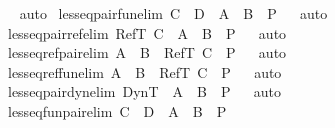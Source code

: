 \begin{isabellebody}
\ \endisadelimproof
\isatagproof
{}\isamarkupfalse \ auto\endisatagproof
{\isafoldproof}\isadelimproof
\endisadelimproof
\isanewline
{}\isamarkupfalse \ lesseq{\isacharunderscore}pair{\isacharunderscore}fun{\isacharbrackleft}elim{\isacharbang}{\isacharbrackright}{\isacharcolon}\ {\isachardoublequoteopen}C\ {\isasymrightarrow}\ D\ {\isasymsqsubseteq}\ A\ {\isasymtimes}\ B\ {\isasymLongrightarrow}\ P{\isachardoublequoteclose}\isadelimproof
\ \endisadelimproof
\isatagproof
{}\isamarkupfalse \ auto\endisatagproof
{\isafoldproof}\isadelimproof
\endisadelimproof
\isanewline
{}\isamarkupfalse \ lesseq{\isacharunderscore}pair{\isacharunderscore}ref{\isacharbrackleft}elim{\isacharbang}{\isacharbrackright}{\isacharcolon}\ {\isachardoublequoteopen}RefT\ C\ {\isasymsqsubseteq}\ A\ {\isasymtimes}\ B\ {\isasymLongrightarrow}\ P{\isachardoublequoteclose}\isadelimproof
\ \endisadelimproof
\isatagproof
{}\isamarkupfalse \ auto\endisatagproof
{\isafoldproof}\isadelimproof
\endisadelimproof
\isanewline
{}\isamarkupfalse \ lesseq{\isacharunderscore}ref{\isacharunderscore}pair{\isacharbrackleft}elim{\isacharbang}{\isacharbrackright}{\isacharcolon}\ {\isachardoublequoteopen}A\ {\isasymtimes}\ B\ {\isasymsqsubseteq}\ RefT\ C\ {\isasymLongrightarrow}\ P{\isachardoublequoteclose}\isadelimproof
\ \endisadelimproof
\isatagproof
{}\isamarkupfalse \ auto\endisatagproof
{\isafoldproof}\isadelimproof
\endisadelimproof
\isanewline
{}\isamarkupfalse \ lesseq{\isacharunderscore}ref{\isacharunderscore}fun{\isacharbrackleft}elim{\isacharbang}{\isacharbrackright}{\isacharcolon}\ {\isachardoublequoteopen}A\ {\isasymrightarrow}\ B\ {\isasymsqsubseteq}\ RefT\ C\ {\isasymLongrightarrow}\ P{\isachardoublequoteclose}\isadelimproof
\ \endisadelimproof
\isatagproof
{}\isamarkupfalse \ auto\endisatagproof
{\isafoldproof}\isadelimproof
\endisadelimproof
\isanewline
{}\isamarkupfalse \ lesseq{\isacharunderscore}pair{\isacharunderscore}dyn{\isacharbrackleft}elim{\isacharbang}{\isacharbrackright}{\isacharcolon}\ {\isachardoublequoteopen}DynT\ {\isasymsqsubseteq}\ A\ {\isasymtimes}\ B\ {\isasymLongrightarrow}\ P{\isachardoublequoteclose}\isadelimproof
\ \endisadelimproof
\isatagproof
{}\isamarkupfalse \ auto\endisatagproof
{\isafoldproof}\isadelimproof
\endisadelimproof
\isanewline
{}\isamarkupfalse \ lesseq{\isacharunderscore}fun{\isacharunderscore}pair{\isacharbrackleft}elim{\isacharbang}{\isacharbrackright}{\isacharcolon}\ {\isachardoublequoteopen}C\ {\isasymtimes}\ D\ {\isasymsqsubseteq}\ A\ {\isasymrightarrow}\ B\ {\isasymLongrightarrow}\ P{\isachardoublequoteclose}\isadelimproof

\end{isabellebody}
